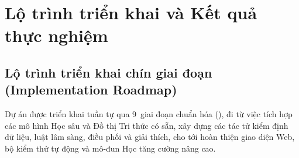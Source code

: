 \chapter{Lộ trình triển khai và Kết quả thực nghiệm}
\label{chap:roadmap}

\section{Lộ trình triển khai chín giai đoạn (Implementation Roadmap)}
\label{sec:implementation-roadmap}

Dự án được triển khai tuần tự qua 9~giai đoạn chuẩn hóa (), đi từ việc tích hợp các mô hình Học sâu và Đồ thị Tri thức có sẵn, xây dựng các tác tử kiểm định dữ liệu, luật lâm sàng, điều phối và giải thích, cho tới hoàn thiện giao diện Web, bộ kiểm thử tự động và mô-đun Học tăng cường nâng cao.

